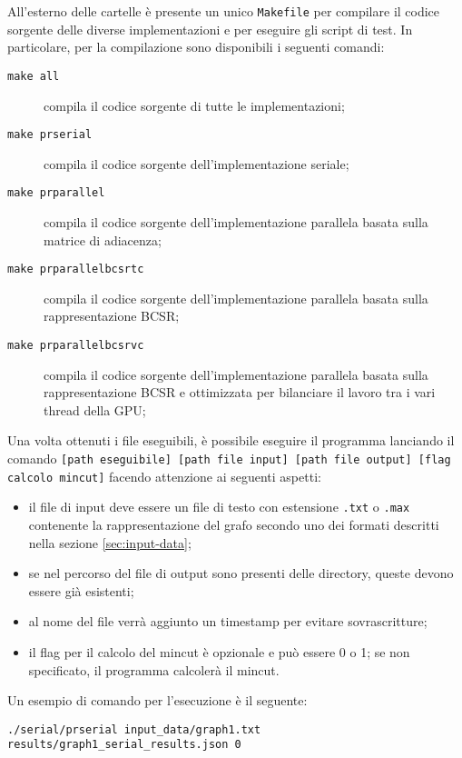         All'esterno delle cartelle è presente un unico \texttt{Makefile} per compilare il codice sorgente delle diverse implementazioni e per eseguire gli script di test. 
        In particolare, per la compilazione sono disponibili i seguenti comandi:
        \begin{description}
            \item[\texttt{make all}] compila il codice sorgente di tutte le implementazioni;
            \item[\texttt{make prserial}] compila il codice sorgente dell'implementazione seriale;
            \item[\texttt{make prparallel}] compila il codice sorgente dell'implementazione parallela basata sulla matrice di adiacenza;
            \item[\texttt{make prparallelbcsrtc}] compila il codice sorgente dell'implementazione parallela basata sulla rappresentazione BCSR;
            \item[\texttt{make prparallelbcsrvc}] compila il codice sorgente dell'implementazione parallela basata sulla rappresentazione BCSR e ottimizzata per bilanciare il lavoro tra i vari thread della GPU;
        \end{description}

        Una volta ottenuti i file eseguibili, è possibile eseguire il programma lanciando il comando \verb|[path eseguibile] [path file input] [path file output] [flag calcolo mincut]| facendo attenzione ai seguenti aspetti:
        \begin{itemize}
            \item il file di input deve essere un file di testo con estensione \verb|.txt| o \verb|.max| contenente la rappresentazione del grafo secondo uno dei formati descritti nella sezione \ref{sec:input-data};
            \item se nel percorso del file di output sono presenti delle directory, queste devono essere già esistenti;
            \item al nome del file verrà aggiunto un timestamp per evitare sovrascritture;
            \item il flag per il calcolo del mincut è opzionale e può essere 0 o 1; se non specificato, il programma calcolerà il mincut.
        \end{itemize}

        Un esempio di comando per l'esecuzione è il seguente:

        \verb|./serial/prserial input_data/graph1.txt results/graph1_serial_results.json 0|


